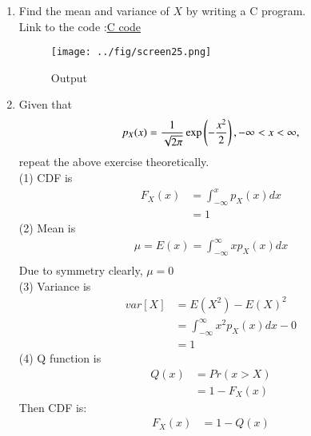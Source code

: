 \documentclass[journal,12pt,twocolumn]{IEEEtran}
\renewcommand\thesection{\arabic{section}}
\begin{document}
\begin{enumerate}[label=\thesection.\arabic*
,ref=\thesection.\theenumi]
\begin{figure}[h]
\centering
\texttt{[image: ../Figures/gauss\_pdf]}
\caption{The PDF of $X$}
\label{fig:gauss_pdf}
\end{figure}

Properties :\\
(1) Area under the curve is One.\\
(2) Symmetric about line $x=\mu$.\\
(3) Increasing in first half and decreasing in other half.

\vspace{0.2in}

\item Find the mean and variance of $X$ by writing a C program.\\
\solution Link to the code :\href{https://github.com/anikettsatpute/Probability-and-Random-Variable-Assignment/blob/main/code/code2_4.c}{C code}
\begin{figure}[h]
\centering
\texttt{[image: ../fig/screen25.png]}
\caption{Output}
\label{fig:gauss_cdf}
\end{figure}

\item Given that
\begin{align}
p_{X}(x) = \frac{1}{\sqrt{2\pi}}\exp\left(-\frac{x^2}{2}\right), -\infty < x < \infty,
\end{align}
repeat the above exercise theoretically.
\solution \\
(1) CDF is 
\begin{align*}
F_X(x) &= \int_{-\infty}^{x}p_X(x)dx\\
&= 1
\end{align*}
(2) Mean is
\begin{align*}
\mu = E(x) = \int_{-\infty}^{\infty} x p_X(x)dx\\
\end{align*}
Due to symmetry clearly, $\mu = 0$\\

(3) Variance is
\begin{align*}
var[X] &= E(X^{2}) - E(X)^{2}\\
&= \int_{-\infty}^{\infty} x^{2} p_X(x)dx  - 0\\
&= 1
\end{align*}
(4) Q function is 
\begin{align*}
Q(x) &= Pr(x>X)\\
&= 1 - F_X(x)
\end{align*}
Then CDF is:
\begin{align*}
F_X(x) &= 1 - Q(x)\\
\end{align*}
\end{enumerate}
\end{document}
